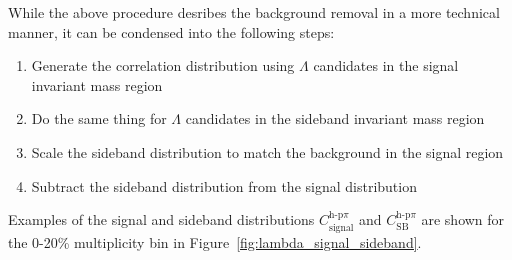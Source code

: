 While the above procedure desribes the background removal in a more technical manner, it can be condensed into the following steps:
%
\begin{enumerate}
	\item Generate the correlation distribution using $\Lambda$ candidates in the signal invariant mass region
	\item Do the same thing for $\Lambda$ candidates in the sideband invariant mass region
	\item Scale the sideband distribution to match the background in the signal region
	\item Subtract the sideband distribution from the signal distribution
\end{enumerate}
%
Examples of the signal and sideband distributions $C_{\text{signal}}^{\text{h-p}\pi}$ and $C_{\text{SB}}^{\text{h-p}\pi}$ are shown for the 0-20\% multiplicity bin in Figure~\ref{fig:lambda_signal_sideband}.

